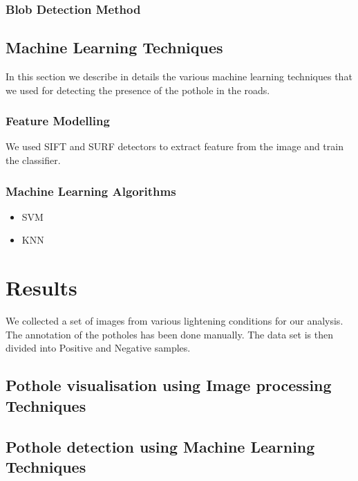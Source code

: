 \documentclass[journal]{IEEEtran}
\begin{document}
\subsubsection{Blob Detection Method}


\subsection{Machine Learning Techniques}

In this section we describe in details the various machine learning techniques that we used for detecting the presence of the pothole in the roads.

\subsubsection{Feature Modelling}

We used SIFT and SURF detectors to extract feature from the image and train the classifier.

\subsubsection{Machine Learning Algorithms}

\begin{itemize}
\item SVM

\item KNN

\end{itemize}

\section{Results}
We collected a set of images from various lightening conditions for our analysis. The annotation of the potholes has been done manually. The data set is then divided into Positive and Negative samples. 

\subsection{Pothole visualisation using Image processing Techniques}



\subsection{Pothole detection using Machine Learning Techniques}
\end{document}
